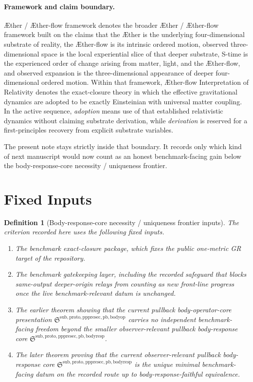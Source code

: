 \documentclass[11pt]{article}
\newcommand{\Aether}{\AE{}ther}
\newcommand{\Aflow}{\AE{}ther-flow}
\newcommand{\TheoryName}{\Aflow{} Interpretation of Relativity}
\newcommand{\TheoryProgram}{\Aether{} / \Aflow{} framework}
\newcommand{\PullbackBodyOperatorCore}{\mathfrak S^{\mathrm{sub,proto,pppresec,pb,bodyop}}}
\newcommand{\PullbackBodyResponseCore}{\mathfrak S^{\mathrm{sub,proto,pppresec,pb,bodyresp}}}
\newtheorem{definition}{Definition}
\begin{document}
\paragraph{Framework and claim boundary.}
\TheoryProgram{} denotes the broader \Aether{} / \Aflow{} framework built on the claims that the \Aether{} is the underlying four-dimensional substrate of reality, the \Aflow{} is its intrinsic ordered motion, observed three-dimensional space is the local experiential slice of that deeper substrate, S-time is the experienced order of change arising from matter, light, and the \Aflow{}, and observed expansion is the three-dimensional appearance of deeper four-dimensional ordered motion. Within that framework, \TheoryName{} denotes the exact-closure theory in which the effective gravitational dynamics are adopted to be exactly Einsteinian with universal matter coupling. In the active sequence, \emph{adoption} means use of that established relativistic dynamics without claiming substrate derivation, while \emph{derivation} is reserved for a first-principles recovery from explicit substrate variables.

The present note stays strictly inside that boundary. It records only which kind of next manuscript would now count as an honest benchmark-facing gain below the body-response-core necessity / uniqueness frontier.

\section{Fixed Inputs}

\begin{definition}[Body-response-core necessity / uniqueness frontier inputs]
The criterion recorded here uses the following fixed inputs.
\begin{enumerate}
    \item The benchmark exact-closure package, which fixes the public one-metric GR target of the repository.
    \item The benchmark gatekeeping layer, including the recorded safeguard that blocks same-output deeper-origin relays from counting as new front-line progress once the live benchmark-relevant datum is unchanged.
    \item The earlier theorem showing that the current pullback body-operator-core presentation \(\PullbackBodyOperatorCore\) carries no independent benchmark-facing freedom beyond the smaller observer-relevant pullback body-response core \(\PullbackBodyResponseCore\).
    \item The later theorem proving that the current observer-relevant pullback body-response core \(\PullbackBodyResponseCore\) is the unique minimal benchmark-facing datum on the recorded route up to body-response-faithful equivalence.
\end{enumerate}
\end{definition}
\end{document}

